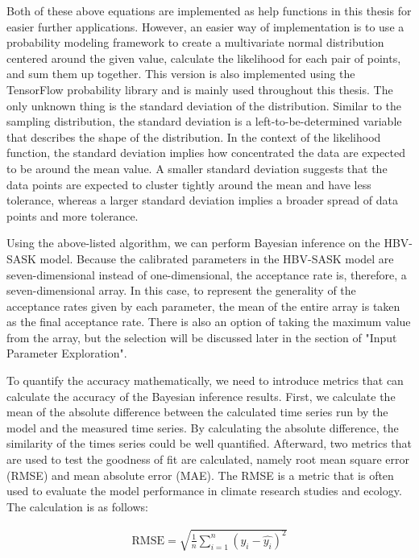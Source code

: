 Both of these above equations are implemented as help functions in this thesis for easier further applications. However, an easier way of implementation is to use a probability modeling framework to create a multivariate normal distribution centered around the given value, calculate the likelihood for each pair of points, and sum them up together. This version is also implemented using the TensorFlow probability library and is mainly used throughout this thesis. The only unknown thing is the standard deviation of the distribution. Similar to the sampling distribution, the standard deviation is a left-to-be-determined variable that describes the shape of the distribution. In the context of the likelihood function, the standard deviation implies how concentrated the data are expected to be around the mean value.\cite{standard_deviation_estimation} A smaller standard deviation suggests that the data points are expected to cluster tightly around the mean and have less tolerance, whereas a larger standard deviation implies a broader spread of data points and more tolerance. 

Using the above-listed algorithm, we can perform Bayesian inference on the HBV-SASK model. Because the calibrated parameters in the HBV-SASK model are seven-dimensional instead of one-dimensional, the acceptance rate is, therefore, a seven-dimensional array. In this case, to represent the generality of the acceptance rates given by each parameter, the mean of the entire array is taken as the final acceptance rate. There is also an option of taking the maximum value from the array, but the selection will be discussed later in the section of "Input Parameter Exploration".

To quantify the accuracy mathematically, we need to introduce metrics that can calculate the accuracy of the Bayesian inference results. First, we calculate the mean of the absolute difference between the calculated time series run by the model and the measured time series. By calculating the absolute difference, the similarity of the times series could be well quantified. Afterward, two metrics that are used to test the goodness of fit are calculated, namely root mean square error (RMSE) and mean absolute error (MAE). The RMSE is a metric that is often used to evaluate the model performance in climate research studies and ecology. The calculation is as follows: 

\begin{align}
\text{RMSE} = \sqrt{\frac 1 n \sum_{i=1}^n (y_i - \hat{y_i})^2}
\end{align}

